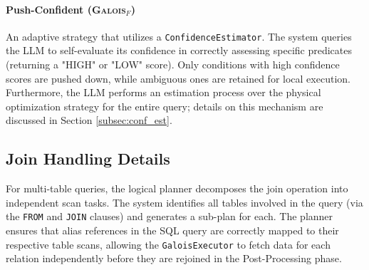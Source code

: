\paragraph{Push-Confident (\textsc{Galois}$_{F}$)}
An adaptive strategy that utilizes a \texttt{ConfidenceEstimator}. The system queries the LLM to self-evaluate its confidence in correctly assessing specific predicates (returning a "HIGH" or "LOW" score). Only conditions with high confidence scores are pushed down, while ambiguous ones are retained for local execution. Furthermore, the LLM performs an estimation process over the physical optimization strategy for the entire query; details on this mechanism are discussed in Section \ref{subsec:conf_est}.

\subsection{Join Handling Details}

For multi-table queries, the logical planner decomposes the join operation into independent scan tasks. The system identifies all tables involved in the query (via the \texttt{FROM} and \texttt{JOIN} clauses) and generates a sub-plan for each. The planner ensures that alias references in the SQL query are correctly mapped to their respective table scans, allowing the \texttt{GaloisExecutor} to fetch data for each relation independently before they are rejoined in the Post-Processing phase.